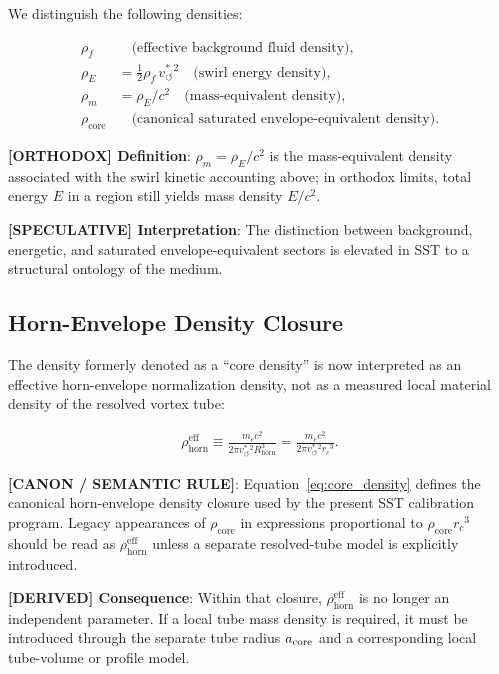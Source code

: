 \documentclass[11pt]{article}
\theoremstyle{definition}
\theoremstyle{plain}
\theoremstyle{remark}
\newcommand{\rhoF}{{\rho_{\!f}}}
\newcommand{\rhoE}{\rho_{\!E}}
\newcommand{\rhoM}{\rho_{\!m}}
\newcommand{\rhocore}{\rho_{\mathrm{core}}}
\newcommand{\rhohorn}{\rho_{\mathrm{horn}}^{\mathrm{eff}}}
\newcommand{\rc}{{r_c}}
\newcommand{\vchar}{v_{\!\boldsymbol{\circlearrowleft}}^{\ast}}
\begin{document}
        We distinguish the following densities:
        
        \begin{align}
            \rhoF &\quad \text{(effective background fluid density)}, \\
            \rhoE &= \tfrac12 \rhoF \, \vchar^2 \quad \text{(swirl energy density)}, \\
            \rhoM &= \rhoE / c^2 \quad \text{(mass-equivalent density)}, \\
            \rhocore &\quad \text{(canonical saturated envelope-equivalent density)}.
        \end{align}

        \textbf{[ORTHODOX] Definition}: $\rhoM=\rhoE/c^2$ is the mass-equivalent density associated with the swirl kinetic accounting above; in orthodox limits, total energy $E$ in a region still yields mass density $E/c^2$.

        \textbf{[SPECULATIVE] Interpretation}: The distinction between background, energetic, and saturated envelope-equivalent sectors is elevated in SST to a structural ontology of the medium.
    
    \subsection{Horn-Envelope Density Closure}
        
        The density formerly denoted as a ``core density'' is now interpreted as an
        effective horn-envelope normalization density, not as a measured local
        material density of the resolved vortex tube:
        
        \begin{align}
            \rhohorn
            \equiv
            \frac{m_e c^2}{2\pi \vchar^2 R_{\mathrm{horn}}^3}
            =
            \frac{m_e c^2}{2\pi \vchar^2 \rc^3}.
            \label{eq:core_density}
        \end{align}
        
        \textbf{[CANON / SEMANTIC RULE]}: Equation~\eqref{eq:core_density}
        defines the canonical horn-envelope density closure used by the present
        SST calibration program. Legacy appearances of $\rhocore$ in expressions
        proportional to $\rhocore\rc^3$ should be read as $\rhohorn$ unless a
        separate resolved-tube model is explicitly introduced.

        \textbf{[DERIVED] Consequence}: Within that closure, $\rhohorn$ is no
        longer an independent parameter. If a local tube mass density is required,
        it must be introduced through the separate tube radius $a_{\rm core}$ and
        a corresponding local tube-volume or profile model.
\end{document}
